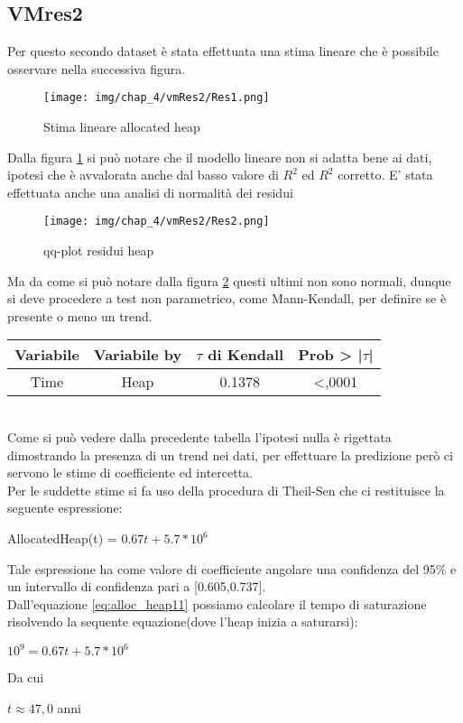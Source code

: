 \subsection{VMres2}

Per questo secondo dataset è stata effettuata una stima lineare che è possibile osservare nella successiva figura.
\begin{figure}[H]
    \centering
    \texttt{[image: img/chap\_4/vmRes2/Res1.png]}
    \caption{Stima lineare allocated heap}
    \label{fig:stim_lin_VmRes13}
\end{figure}
\noindent
Dalla figura \ref{fig:stim_lin_VmRes13} si può notare che il modello lineare non si adatta bene ai dati, ipotesi che è avvalorata anche dal basso valore di $R^2$ ed $R^2$ corretto.
E' stata effettuata anche una analisi di normalità dei residui
\begin{figure}[H]
    \centering
    \texttt{[image: img/chap\_4/vmRes2/Res2.png]}
    \caption{qq-plot residui heap}
    \label{fig:qq_plot_VmRes14}
\end{figure}
Ma da come si può notare dalla figura \ref{fig:qq_plot_VmRes14} questi ultimi non sono normali, dunque si deve procedere a test non parametrico, come Mann-Kendall, per definire se è presente o meno un trend.\\
\begin{table}[htbp]
    \centering
    \begin{tabular}{|c|c|c|c|} %
        \hline
        Variabile & Variabile by & $\tau$ di Kendall &Prob > |$\tau$| \\ %
        \hline
        Time & Heap & 0.1378 & <,0001\\
        \hline
    \end{tabular}
\end{table}
\\
Come si può vedere dalla precedente tabella l'ipotesi nulla è rigettata dimostrando la presenza di un trend nei dati, per effettuare la predizione però ci servono le stime di coefficiente ed intercetta.\\
Per le suddette stime si fa uso della procedura di Theil-Sen che ci restituisce la seguente espressione:
\begin{center}
   AllocatedHeap(t) = $0.67t + 5.7*10^6$
   \label{eq:alloc_heap11}
\end{center}
Tale espressione ha come valore di coefficiente angolare una confidenza del 95\% e un intervallo di confidenza pari a [0.605,0.737].\\
Dall'equazione \ref{eq:alloc_heap11} possiamo calcolare il tempo di saturazione risolvendo la sequente equazione(dove l'heap inizia a saturarsi):
\begin{center}
    $
    10^9 = 0.67t+5.7*10^6
    $\\
\end{center}
Da cui 
\begin{center}
    $
    t \approx 47,0$ anni
\end{center}

